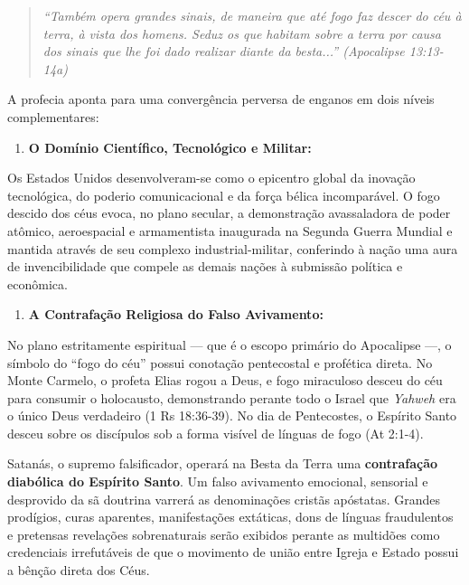 \begin{quote}
\itshape \textit{``Também opera grandes sinais, de maneira que até fogo faz descer do céu à terra, à vista dos homens. Seduz os que habitam sobre a terra por causa dos sinais que lhe foi dado realizar diante da besta...''} (Apocalipse 13:13-14a)
\end{quote}


A profecia aponta para uma convergência perversa de enganos em dois níveis complementares:

\begin{enumerate}
  \item \textbf{O Domínio Científico, Tecnológico e Militar:}
\end{enumerate}

Os Estados Unidos desenvolveram-se como o epicentro global da inovação tecnológica, do poderio comunicacional e da força bélica incomparável. O fogo descido dos céus evoca, no plano secular, a demonstração avassaladora de poder atômico, aeroespacial e armamentista inaugurada na Segunda Guerra Mundial e mantida através de seu complexo industrial-militar, conferindo à nação uma aura de invencibilidade que compele as demais nações à submissão política e econômica.

\begin{enumerate}
  \item \textbf{A Contrafação Religiosa do Falso Avivamento:}
\end{enumerate}

No plano estritamente espiritual — que é o escopo primário do Apocalipse —, o símbolo do ``fogo do céu'' possui conotação pentecostal e profética direta. No Monte Carmelo, o profeta Elias rogou a Deus, e fogo miraculoso desceu do céu para consumir o holocausto, demonstrando perante todo o Israel que \textit{Yahweh} era o único Deus verdadeiro (1 Rs 18:36-39). No dia de Pentecostes, o Espírito Santo desceu sobre os discípulos sob a forma visível de línguas de fogo (At 2:1-4).

Satanás, o supremo falsificador, operará na Besta da Terra uma \textbf{contrafação diabólica do Espírito Santo}. Um falso avivamento emocional, sensorial e desprovido da sã doutrina varrerá as denominações cristãs apóstatas. Grandes prodígios, curas aparentes, manifestações extáticas, dons de línguas fraudulentos e pretensas revelações sobrenaturais serão exibidos perante as multidões como credenciais irrefutáveis de que o movimento de união entre Igreja e Estado possui a bênção direta dos Céus.

